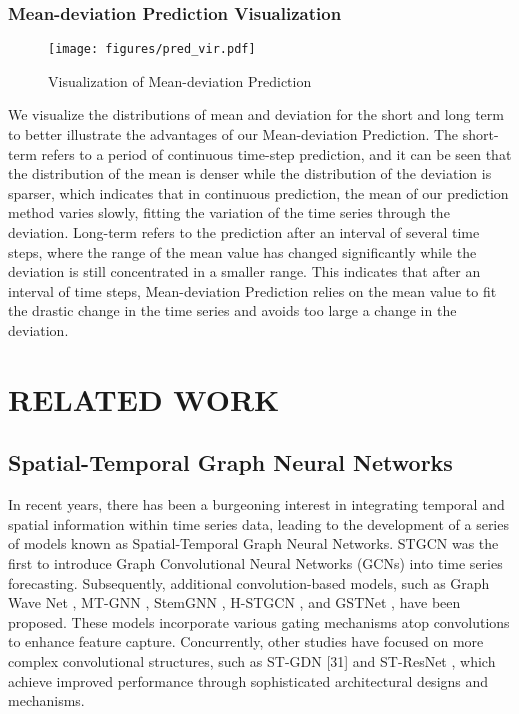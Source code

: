 \subsubsection{Mean-deviation Prediction Visualization}

\begin{figure}[thbp]
    \centering
    \texttt{[image: figures/pred\_vir.pdf]}
    \caption[width=\textwidth]{Visualization of Mean-deviation Prediction}
    \label{fig:pred_vir}
\end{figure}
We visualize the distributions of mean and deviation for the short and long term to better illustrate the advantages of our Mean-deviation Prediction. The short-term refers to a period of continuous time-step prediction, and it can be seen that the distribution of the mean is denser while the distribution of the deviation is sparser, which indicates that in continuous prediction, the mean of our prediction method varies slowly, fitting the variation of the time series through the deviation. Long-term refers to the prediction after an interval of several time steps, where the range of the mean value has changed significantly while the deviation is still concentrated in a smaller range. This indicates that after an interval of time steps, Mean-deviation Prediction relies on the mean value to fit the drastic change in the time series and avoids too large a change in the deviation.

\section{RELATED WORK}
\subsection{Spatial-Temporal Graph Neural Networks}
In recent years, there has been a burgeoning interest in integrating temporal and spatial information within time series data, leading to the development of a series of models known as Spatial-Temporal Graph Neural Networks. STGCN \cite{STGCN} was the first to introduce Graph Convolutional Neural Networks (GCNs) \cite{GCN} into time series forecasting. Subsequently, additional convolution-based models, such as Graph Wave Net \cite{Gwave}, MT-GNN \cite{MTGNN}, StemGNN \cite{stemGNN}, H-STGCN \cite{H-STGCN}, and GSTNet \cite{GSTNet}, have been proposed. These models incorporate various gating mechanisms atop convolutions to enhance feature capture. Concurrently, other studies have focused on more complex convolutional structures, such as ST-GDN [31] and ST-ResNet \cite{ST-GDN}, which achieve improved performance through sophisticated architectural designs and mechanisms.

